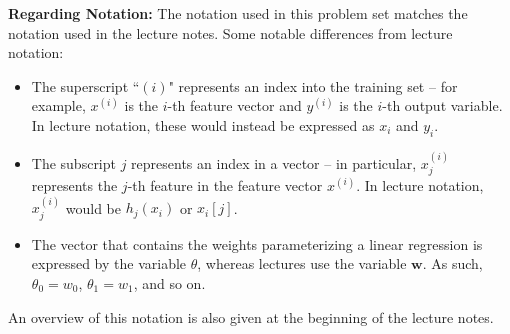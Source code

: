 \textbf{Regarding Notation:} The notation used in this problem set matches the notation used in the lecture notes. Some notable differences from lecture notation:
\begin{itemize}
    \item The superscript ``$(i)$" represents an index into the training set -- for example, $x^{(i)}$ is the $i$-th feature vector and $y^{(i)}$ is the $i$-th output variable. In lecture notation, these would instead be expressed as $x_i$ and $y_i$.

    \item The subscript $j$ represents an index in a vector -- in particular, $x^{(i)}_j$ represents the $j$-th feature in the feature vector $x^{(i)}$. In lecture notation, $x^{(i)}_j$ would be $h_j(x_i)$ or $x_i[j]$.

    \item The vector that contains the weights parameterizing a linear regression is expressed by the variable $\theta$, whereas lectures use the variable $\textbf{w}$. As such, $\theta_0 = w_0$, $\theta_1 = w_1$, and so on.



\end{itemize}

An overview of this notation is also given at the beginning of the lecture notes.